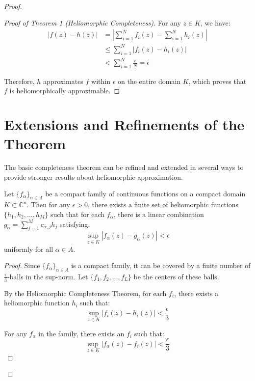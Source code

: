 \begin{proof}
\begin{proof}[Proof of Theorem 1 (Heliomorphic Completeness)]
For any $z \in K$, we have:
\begin{align}
|f(z) - h(z)| &= \left|\sum_{i=1}^{N} f_i(z) - \sum_{i=1}^{N} h_i(z)\right|\\
&\leq \sum_{i=1}^{N} |f_i(z) - h_i(z)|\\
&< \sum_{i=1}^{N} \frac{\epsilon}{N} = \epsilon
\end{align}

Therefore, $h$ approximates $f$ within $\epsilon$ on the entire domain $K$, which proves that $f$ is heliomorphically approximable.
\end{proof}

\section{Extensions and Refinements of the Theorem}

The basic completeness theorem can be refined and extended in several ways to provide stronger results about heliomorphic approximation.

\begin{theorem}
Let $\{f_{\alpha}\}_{\alpha \in A}$ be a compact family of continuous functions on a compact domain $K \subset \mathbb{C}^n$. Then for any $\epsilon > 0$, there exists a finite set of heliomorphic functions $\{h_1, h_2, \ldots, h_M\}$ such that for each $f_{\alpha}$, there is a linear combination $g_{\alpha} = \sum_{j=1}^{M} c_{\alpha,j}h_j$ satisfying:
\begin{equation}
\sup_{z \in K} |f_{\alpha}(z) - g_{\alpha}(z)| < \epsilon
\end{equation}
uniformly for all $\alpha \in A$.
\end{theorem}

\begin{proof}
Since $\{f_{\alpha}\}_{\alpha \in A}$ is a compact family, it can be covered by a finite number of $\frac{\epsilon}{3}$-balls in the sup-norm. Let $\{f_1, f_2, \ldots, f_L\}$ be the centers of these balls.

By the Heliomorphic Completeness Theorem, for each $f_i$, there exists a heliomorphic function $h_i$ such that:
\begin{equation}
\sup_{z \in K} |f_i(z) - h_i(z)| < \frac{\epsilon}{3}
\end{equation}

For any $f_{\alpha}$ in the family, there exists an $f_i$ such that:
\begin{equation}
\sup_{z \in K} |f_{\alpha}(z) - f_i(z)| < \frac{\epsilon}{3}
\end{equation}


\end{proof}
\end{proof}
